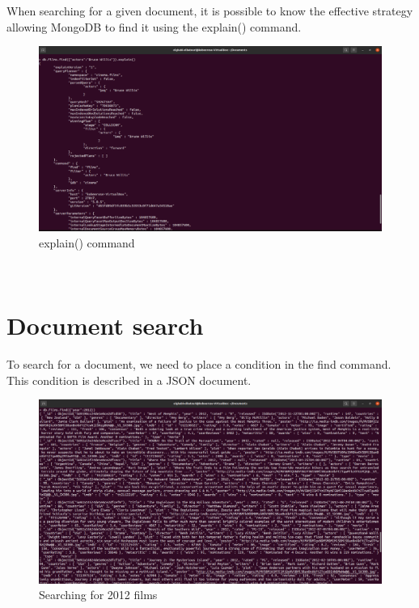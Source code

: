 \begin{spacing}{0.9}
\par When searching for a given document, it is possible to know the effective strategy
allowing MongoDB to find it using the explain() command.
\\
\begin{figure}[!htb] 
\begin{center} 
\includegraphics[width=1\linewidth]{Pictures/MongoDB/Examining MongoDB Query Features/Index management/explain() command} 
\end{center} 
\caption{explain() command} 
\end{figure}  \FloatBarrier
\\
\newpage
\section{Document search }
\par To search for a document, we need to place a condition in the find command.
This condition is described in a JSON document.
\\
\begin{figure}[!htb] 
\begin{center} 
\includegraphics[width=1\linewidth]{Pictures/MongoDB/Examining MongoDB Query Features/Document search/Searching for 2012 films} 
\end{center} 
\caption{Searching for 2012 films} 
\end{figure}  \FloatBarrier
\\


\end{spacing}
